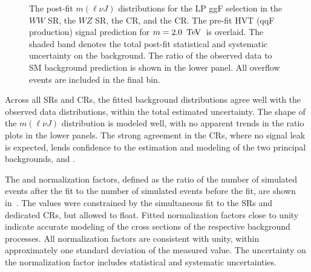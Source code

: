 \begin{figure}[htb]
\caption[Post-fit $m(\ell\nu J)$ distribution for low purity, gluon-gluon fusion selection]{The post-fit $m(\ell\nu J)$ distributions for the LP ggF selection in \protect{} the $WW$ SR, \protect{} the $WZ$ SR, \protect{} the \Wjets CR, and   \protect{} the \ttbar CR. The pre-fit HVT (qqF production) signal prediction for $m=2.0\,\TeV$\, is overlaid. The shaded band denotes the total post-fit statistical and systematic uncertainty on the background. The ratio of the observed data to SM background prediction is shown in the lower panel. All overflow events are included in the final bin.}
\label{fig:pf_lp_ggf}
\end{figure}

\clearpage
Across all SRs and CRs, the fitted background distributions agree well with the observed data distributions, within the total estimated uncertainty. The shape of the $m(\ell\nu J)$ distribution is modeled well, with no apparent trends in the ratio plots in the lower panels. 
The strong agreement in the CRs, where no signal leak is expected, lends confidence to the estimation and modeling of the two principal backgrounds, \Wjets and \ttbar. 


The \Wjets and \ttbar normalization factors, defined as the ratio of the number of simulated events after the fit to the number of simulated events before the fit, are shown in~\Tab{\ref{tab:bkg_norms}}. The values were constrained by the simultaneous fit to the SRs and dedicated CRs, but allowed to float. Fitted normalization factors close to unity indicate accurate modeling of the cross sections of the respective background processes.  All normalization factors are consistent with unity, within approximately one standard deviation of the measured value. The uncertainty on the normalization factor includes statistical and systematic uncertainties.

